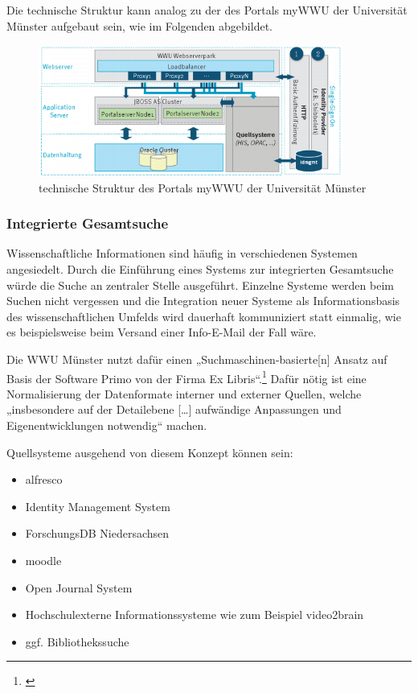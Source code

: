 Die technische Struktur kann analog zu der des Portals myWWU der Universität Münster aufgebaut sein, wie im Folgenden abgebildet.
\begin{figure}[h!]
	\centering
	\includegraphics[width=10cm]{kapitel/gruppe3/bilder/struktur_mywwu}
	\caption{technische Struktur des Portals myWWU der Universität Münster}
	\label{fig_struktur_mywwu}
\end{figure}

\subsubsection{Integrierte Gesamtsuche}
Wissenschaftliche Informationen sind häufig in verschiedenen Systemen angesiedelt. Durch die Einführung eines Systems zur integrierten Gesamtsuche würde die Suche an zentraler Stelle ausgeführt. Einzelne Systeme werden beim Suchen nicht vergessen und die Integration neuer Systeme als Informationsbasis des wissenschaftlichen Umfelds wird dauerhaft kommuniziert statt einmalig, wie es beispielsweise beim Versand einer Info-E-Mail der Fall wäre.

Die WWU Münster nutzt dafür einen „Suchmaschinen-basierte[n] Ansatz auf Basis der Software Primo von der Firma Ex Libris“.\footnote{\cite{vogl_fortschritte_2012}} Dafür nötig ist eine Normalisierung der Datenformate interner und externer Quellen, welche „insbesondere auf der Detailebene […] aufwändige Anpassungen und Eigenentwicklungen notwendig“ machen.

Quellsysteme ausgehend von diesem Konzept können sein:
\begin{itemize}
	\item alfresco
	\item Identity Management System
	\item ForschungsDB Niedersachsen
	\item moodle
	\item Open Journal System
	\item Hochschulexterne Informationssysteme wie zum Beispiel video2brain
	\item ggf. Bibliothekssuche
\end{itemize}

